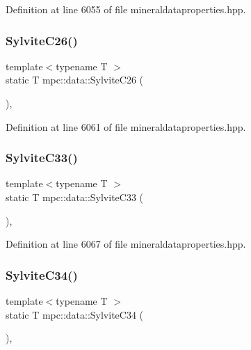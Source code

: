 Definition at line 6055 of file mineraldataproperties.\+hpp.

\mbox{\label{namespacempc_1_1data_ac6a64dd34a6cf65e236f21077524695f}} 
\subsubsection{\texorpdfstring{Sylvite\+C26()}{SylviteC26()}}
{\footnotesize\ttfamily template$<$typename T $>$ \\
static T mpc\+::data\+::\+Sylvite\+C26 (\begin{DoxyParamCaption}{ }\end{DoxyParamCaption})\hspace{0.3cm}{\ttfamily [inline]}, {\ttfamily [static]}}



Definition at line 6061 of file mineraldataproperties.\+hpp.

\mbox{\label{namespacempc_1_1data_a2a6ff2d23de7e004189693c7fb3bc998}} 
\subsubsection{\texorpdfstring{Sylvite\+C33()}{SylviteC33()}}
{\footnotesize\ttfamily template$<$typename T $>$ \\
static T mpc\+::data\+::\+Sylvite\+C33 (\begin{DoxyParamCaption}{ }\end{DoxyParamCaption})\hspace{0.3cm}{\ttfamily [inline]}, {\ttfamily [static]}}



Definition at line 6067 of file mineraldataproperties.\+hpp.

\mbox{\label{namespacempc_1_1data_aa3385c3989f1507bec63c6e87b4a59be}} 
\subsubsection{\texorpdfstring{Sylvite\+C34()}{SylviteC34()}}
{\footnotesize\ttfamily template$<$typename T $>$ \\
static T mpc\+::data\+::\+Sylvite\+C34 (\begin{DoxyParamCaption}{ }\end{DoxyParamCaption})\hspace{0.3cm}{\ttfamily [inline]}, {\ttfamily [static]}}



